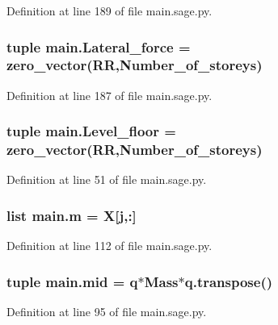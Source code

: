 Definition at line 189 of file main.\+sage.\+py.

\hypertarget{a00039_a8d395a4120126cf1de1d3f04b1fc3457}{}
\subsubsection[{Lateral\+\_\+force}]{\setlength{\rightskip}{0pt plus 5cm}tuple main.\+Lateral\+\_\+force = zero\+\_\+vector(R\+R,Number\+\_\+of\+\_\+storeys)}\label{a00039_a8d395a4120126cf1de1d3f04b1fc3457}


Definition at line 187 of file main.\+sage.\+py.

\hypertarget{a00039_aa6efadb1dc89cc9d5b75113b025fe962}{}
\subsubsection[{Level\+\_\+floor}]{\setlength{\rightskip}{0pt plus 5cm}tuple main.\+Level\+\_\+floor = zero\+\_\+vector(R\+R,Number\+\_\+of\+\_\+storeys)}\label{a00039_aa6efadb1dc89cc9d5b75113b025fe962}


Definition at line 51 of file main.\+sage.\+py.

\hypertarget{a00039_af6e3698b7f50fc004eb759d7c447fdb3}{}
\subsubsection[{m}]{\setlength{\rightskip}{0pt plus 5cm}list main.\+m = {\bf X}\mbox{[}{\bf j},\+:\mbox{]}}\label{a00039_af6e3698b7f50fc004eb759d7c447fdb3}


Definition at line 112 of file main.\+sage.\+py.

\hypertarget{a00039_a70551c7fc78da8fdec83fe500056d388}{}
\subsubsection[{mid}]{\setlength{\rightskip}{0pt plus 5cm}tuple main.\+mid = {\bf q}$\ast$Mass$\ast$q.\+transpose()}\label{a00039_a70551c7fc78da8fdec83fe500056d388}


Definition at line 95 of file main.\+sage.\+py.

\hypertarget{a00039_ae8c706be82800a75da37e5da67018f90}{}
